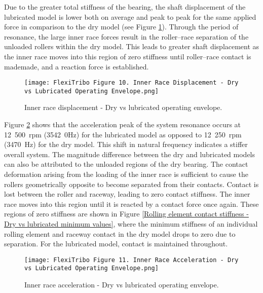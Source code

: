 Due to the greater total stiffness of the bearing, the shaft displacement of the lubricated model is lower both on average and peak to peak for the same applied force in comparison to the dry model (see Figure \ref{Inner race displacement - Dry vs lubricated operating envelope}). Through the period of resonance, the large inner race forces result in the roller–race separation of the unloaded rollers within the dry model. This leads to greater shaft displacement as the inner race moves into this region of zero stiffness until roller–race contact is mademade, and a reaction force is established.

\begin{figure}  
	\texttt{[image: FlexiTribo Figure 10. Inner Race Displacement - Dry vs Lubricated Operating Envelope.png]}
	\caption{Inner race displacement - Dry vs lubricated operating envelope.}
	\label{Inner race displacement - Dry vs lubricated operating envelope}
\end{figure} 

Figure \ref{Inner race acceleration - Dry vs lubricated operating envelope} shows that the acceleration peak of the system resonance occurs at 12~500~$\mathrm{rpm}$ (3542~0$\mathrm{Hz}$) for the lubricated model as opposed to 12~250~$\mathrm{rpm}$ (3470~$\mathrm{Hz}$) for the dry model. This shift in natural frequency indicates a stiffer overall system. The magnitude difference between the dry and lubricated models can also be attributed to the unloaded regions of the dry bearing. The contact deformation arising from the loading of the inner race is sufficient to cause the rollers geometrically opposite to become separated from their contacts. Contact is lost between the roller and raceway, leading to zero contact stiffness. The inner race moves into this region until it is reacted by a contact force once again. These regions of zero stiffness are shown in Figure \ref{Rolling element contact stiffness - Dry vs lubricated minimum values}, where the minimum stiffness of an individual rolling element and raceway contact in the dry model drops to zero due to separation. For the lubricated model, contact is maintained throughout.

\begin{figure}  
	\texttt{[image: FlexiTribo Figure 11. Inner Race Acceleration - Dry vs Lubricated Operating Envelope.png]}
	\caption{Inner race acceleration - Dry vs lubricated operating envelope.}
	\label{Inner race acceleration - Dry vs lubricated operating envelope}
\end{figure}

